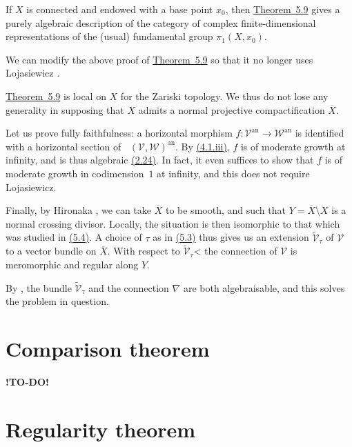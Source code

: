 \documentclass{report}
\renewcommand{\cal}[1]{{\mathcal{#1}}}
\newcommand{\an}{\mathrm{an}}
\DeclareMathOperator{\shHom}{\underline{Hom}}
\newcommand{\todo}{\textbf{ !TO-DO! }}
\newcommand{\oldpage}[1]{\marginpar{\footnotesize$\Big\vert$ \textit{p.~#1}}}
\begin{document}
If $X$ is connected and endowed with a base point $x_0$, then \hyperref[II.5.9]{Theorem~5.9} gives a purely algebraic description of the category of complex finite-dimensional representations of the (usual) fundamental group $\pi_1(X,x_0)$.

We can modify the above proof of \hyperref[II.5.9]{Theorem~5.9} so that it no longer uses Lojasiewicz \cite{17}.

\hyperref[II.5.9]{Theorem~5.9} is local on $X$ for the Zariski topology.
We thus do not lose any generality in supposing that $X$ admits a normal projective compactification $\overline{X}$.

Let us prove fully faithfulness:
\oldpage{98}
a horizontal morphism $f\colon\cal{V}^\an\to\cal{W}^\an$ is identified with a horizontal section of $\shHom(\cal{V},\cal{W})^\an$.
By \hyperref[II.4.1]{(4.1.iii)}, $f$ is of moderate growth at infinity, and is thus algebraic \hyperref[II.2.24]{(2.24)}.
In fact, it even suffices to show that $f$ is of moderate growth in codimension~$1$ at infinity, and this does not require Lojasiewicz.

Finally, by Hironaka \cite{12}, we can take $\overline{X}$ to be smooth, and such that $Y=\overline{X}\setminus X$ is a normal crossing divisor.
Locally, the situation is then isomorphic to that which was studied in \hyperref[II.5.4]{(5.4)}.
A choice of $\tau$ as in \hyperref[II.5.3]{(5.3)} thus gives us an extension $\widetilde{\cal{V}}_\tau$ of $\cal{V}$ to a vector bundle on $\overline{X}$.
With respect to $\widetilde{\cal{V}}_\tau$< the connection of $\cal{V}$ is meromorphic and regular along $Y$.

By \cite{GAGA}, the bundle $\widetilde{\cal{V}}_\tau$ and the connection $\nabla$ are both algebraisable, and this solves the problem in question.



\section{Comparison theorem}
\label{II.6}










\todo










\section{Regularity theorem}
\label{II.7}
\end{document}
